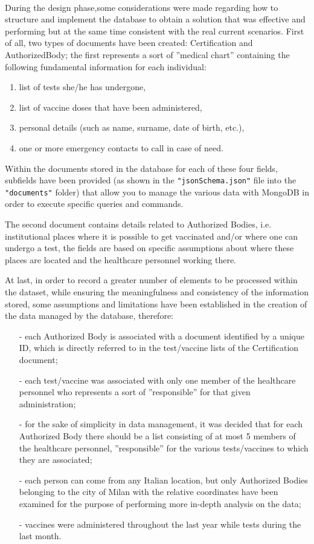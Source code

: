 \documentclass[a4paper,12pt]{article}
\begin{document}
\paragraph{} During the design phase,some considerations were made regarding how to structure and implement the database to obtain a solution that was effective and performing but at the same time consistent with the real current scenarios. First of all, two types of documents have been created: Certification and AuthorizedBody; the first represents a sort of ”medical chart” containing the following fundamental information for each individual:
  \begin{enumerate}[noitemsep]
    \item list of tests she/he has undergone,
    \item list of vaccine doses that have been administered,
    \item personal details (such as name, surname, date of birth, etc.),
    \item one or more emergency contacts to call in case of need.
   \end{enumerate}
Within the documents stored in the database for each of these four fields, subfields have been provided (as shown in the \texttt{"jsonSchema.json"} file into the \texttt{"documents"} folder) that allow you to manage the various data with MongoDB in order to execute specific queries and commands. \par
The second document contains details related to Authorized Bodies, i.e. institutional places where it is possible to get vaccinated and/or where one can undergo a test, the fields are based on specific assumptions about where these places are located and the healthcare personnel working there. \par
At last, in order to record a greater number of elements to be processed within the dataset, while ensuring the meaningfulness and consistency of the information stored, some assumptions and limitations have been established in the creation of the data managed by the database, therefore:
  \begin{itemize}[noitemsep]
    \item[-] each Authorized Body is associated with a document identified by a unique ID, which is directly referred to in the test/vaccine lists of the Certification document;
    \item[-] each test/vaccine was associated with only one member of the healthcare personnel who represents a sort of ”responsible” for that given administration;
    \item[-] for the sake of simplicity in data management, it was decided that for each Authorized Body there should be a list consisting of at most 5 members of the healthcare personnel, ”responsible” for the various tests/vaccines to which they are associated;
    \item[-] each person can come from any Italian location, but only Authorized Bodies belonging to the city of Milan with the relative coordinates have been examined for the purpose of performing more in-depth analysis on the data;
	\item[-] vaccines were administered throughout the last year while tests during the last month.
  \end{itemize}
\clearpage
\end{document}
